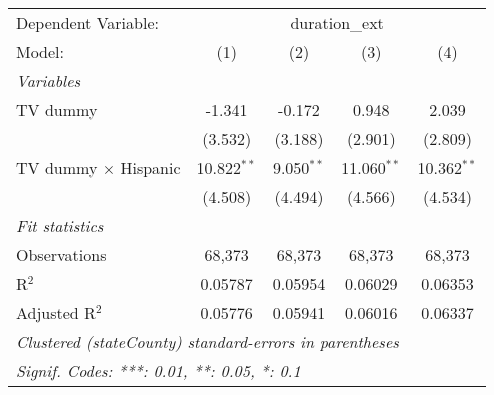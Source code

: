 \begin{tabular}{lcccc}
\tabularnewline\midrule\midrule
Dependent Variable:&\multicolumn{4}{c}{duration\_ext}\\
Model:&(1) & (2) & (3) & (4)\\
\midrule \emph{Variables}&   &   &   &  \\
TV dummy & -1.341 & -0.172 & 0.948 & 2.039\\
  &(3.532) & (3.188) & (2.901) & (2.809)\\
TV dummy $\times$ Hispanic & 10.822$^{**}$ & 9.050$^{**}$ & 11.060$^{**}$ & 10.362$^{**}$\\
  &(4.508) & (4.494) & (4.566) & (4.534)\\
\midrule \emph{Fit statistics}&  & & & \\
Observations & 68,373&68,373&68,373&68,373\\
R$^2$ & 0.05787&0.05954&0.06029&0.06353\\
Adjusted R$^2$ & 0.05776&0.05941&0.06016&0.06337\\
\midrule\midrule\multicolumn{5}{l}{\emph{Clustered (stateCounty) standard-errors in parentheses}}\\
\multicolumn{5}{l}{\emph{Signif. Codes: ***: 0.01, **: 0.05, *: 0.1}}\\
\end{tabular}


